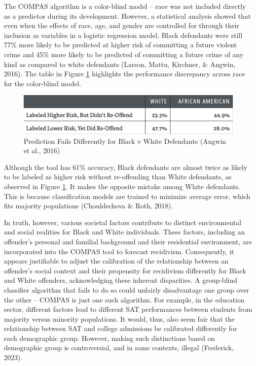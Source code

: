 \documentclass[12pt, twoside]{amherstthesis}
\begin{document}
The COMPAS algorithm is a color-blind model -- race was not included directly as a predictor during its development. However, a statistical analysis showed that even when the effects of race, age, and gender are controlled for through their inclusion as variables in a logistic regression model, Black defendants were still 77\% more likely to be predicted at higher risk of committing a future violent crime and 45\% more likely to be predicted of committing a future crime of any kind as compared to white defendants (Larson, Mattu, Kirchner, \& Angwin, 2016). The table in Figure \ref{fig:compas1} highlights the performance discrepancy across race for the color-blind model.
\begin{figure}

{\centering \includegraphics[width=1\linewidth]{figures/compas1} 

}

\caption[COMPAS Prediction Fails Differently for Black v White Defendants]{Prediction Fails Differently for Black v White Defendants (Angwin et al., 2016)}\label{fig:compas1}
\end{figure}
Although the tool has 61\% accuracy, Black defendants are almost twice as likely to be labeled as higher risk without re-offending than White defendants, as observed in Figure \ref{fig:compas1}. It makes the opposite mistake among White defendants. This is because classification models are trained to minimize average error, which fits majority populations (Chouldechova \& Roth, 2018).

In truth, however, various societal factors contribute to distinct environmental and social realities for Black and White individuals. These factors, including an offender's personal and familial background and their residential environment, are incorporated into the COMPAS tool to forecast recidivism. Consequently, it appears justifiable to adjust the calibration of the relationship between an offender's social context and their propensity for recidivism differently for Black and White offenders, acknowledging these inherent disparities. A group-blind classifier algorithm that fails to do so could unfairly disadvantage one group over the other -- COMPAS is just one such algorithm. For example, in the education sector, different factors lead to different SAT performances between students from majority versus minority populations. It would, thus, also seem fair that the relationship between SAT and college admissions be calibrated differently for each demographic group. However, making such distinctions based on demographic group is controversial, and in some contexts, illegal (Frederick, 2023).
\end{document}

